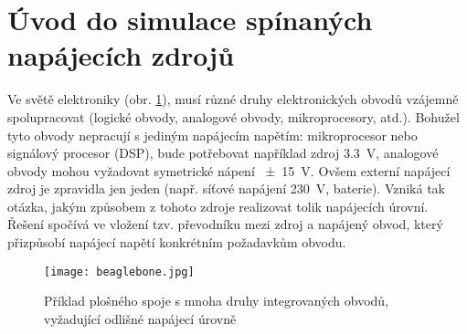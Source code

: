  \section{Úvod do simulace spínaných napájecích zdrojů}
    
    Ve světě elektroniky (obr. \ref{SPICE:Basso_intro}), musí různé druhy elektronických obvodů 
    vzájemně spolupracovat (logické obvody, analogové obvody, mikroprocesory, atd.). Bohužel tyto 
    obvody nepracují s jediným napájecím napětím: mikroprocesor nebo signálový procesor (DSP), bude 
    potřebovat například zdroj \SI{3.3}{\volt}, analogové obvody mohou vyžadovat symetrické nápení 
    \SI{\pm15}{\volt}. Ovšem externí napájecí zdroj je zpravidla jen jeden (např. síťové napájení 
    \SI{230}{\volt}, baterie). Vzniká tak otázka, jakým způsobem z tohoto zdroje realizovat tolik 
    napájecích úrovní. Řešení spočívá ve vložení tzv. převodníku mezi zdroj a napájený obvod, který 
    přizpůsobí napájecí napětí konkrétním požadavkům obvodu.
    
    \begin{figure}[ht!]
      \centering
      \texttt{[image: beaglebone.jpg]}
      \caption{Příklad plošného spoje s mnoha druhy integrovaných obvodů, vyžadující odlišné 
               napájecí úrovně}
      \label{SPICE:Basso_intro}
    \end{figure}

